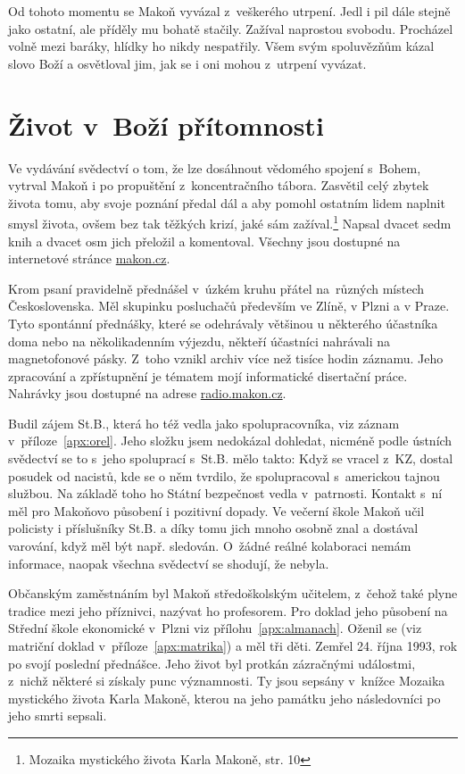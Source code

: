 Od tohoto momentu se Makoň vyvázal z~veškerého utrpení. Jedl i pil dále stejně
jako ostatní, ale příděly mu bohatě stačily. Zažíval naprostou svobodu.
Procházel volně mezi baráky, hlídky ho nikdy nespatřily. Všem svým spoluvězňům
kázal slovo Boží a osvětloval jim, jak se i oni mohou z~utrpení
vyvázat.

\section{Život v~Boží přítomnosti}

Ve vydávání svědectví o tom, že lze dosáhnout vědomého spojení s~Bohem, vytrval
Makoň i po propuštění z~koncentračního tábora. Zasvětil celý zbytek života tomu,
aby svoje poznání předal dál a aby pomohl ostatním lidem
naplnit smysl života, ovšem bez tak těžkých krizí, jaké sám
zažíval.\footnote{Mozaika mystického života Karla Makoně, str. 10} Napsal
dvacet sedm knih a dvacet osm jich přeložil a komentoval. Všechny jsou dostupné
na internetové stránce \href{http://makon.cz/}{makon.cz}.

Krom psaní pravidelně přednášel v~úzkém kruhu přátel na~různých místech
Československa. Měl skupinku posluchačů především ve Zlíně, v Plzni a v Praze.
Tyto spontánní přednášky, které se odehrávaly většinou u některého účastníka
doma nebo na několikadenním výjezdu, někteří účastníci nahrávali na
magnetofonové pásky. Z~toho vznikl archiv více než tisíce hodin záznamu. Jeho
zpracování a zpřístupnění je tématem mojí informatické disertační
práce.\cite{kruuza2021iterativni} Nahrávky jsou dostupné na adrese
\href{http://radio.makon.cz/}{radio.makon.cz}.

Budil zájem St.B., která ho též vedla jako spolupracovníka, viz záznam
v~příloze~\ref{apx:orel}. Jeho složku jsem nedokázal dohledat, nicméně podle
ústních svědectví se to s~jeho spoluprací s~St.B. mělo takto: Když se vracel
z~KZ, dostal posudek od nacistů, kde se o něm tvrdilo, že spolupracoval
s~americkou tajnou službou. Na základě toho ho Státní bezpečnost vedla
v~patrnosti. Kontakt s~ní měl pro Makoňovo působení i pozitivní dopady. Ve
večerní škole Makoň učil policisty i příslušníky St.B. a díky tomu jich mnoho
osobně znal a dostával varování, když měl být např. sledován. O~žádné reálné
kolaboraci nemám informace, naopak všechna svědectví se shodují, že nebyla.

Občanským zaměstnáním byl Makoň středoškolským učitelem, z~čehož také plyne
tradice mezi jeho příznivci, nazývat ho profesorem. Pro doklad jeho působení na
Střední škole ekonomické v~Plzni viz přílohu~\ref{apx:almanach}. Oženil se (viz matriční
doklad v~příloze~\ref{apx:matrika}) a měl tři děti.
Zemřel 24. října 1993, rok po svojí poslední přednášce. Jeho život byl protkán
zázračnými událostmi, z~nichž některé si získaly punc významnosti. Ty jsou
sepsány v~knížce Mozaika mystického života Karla Makoně,\cite{kaliban2002mozaika} kterou na
jeho památku jeho následovníci po jeho smrti sepsali.

